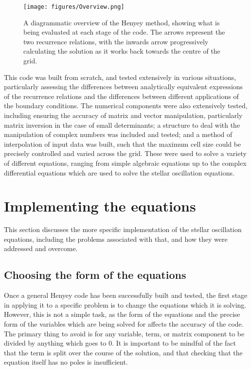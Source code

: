 \documentclass[11pt]{amsart}
\begin{document}
\begin{figure}
\begin{center}
\label{fig:overview}
\texttt{[image: figures/Overview.png]}
\caption{A diagrammatic overview of the Henyey method, showing what is being evaluated at each stage of the code.  The arrows represent the two recurrence relations, with the inwards arrow progressively calculating the solution as it works back towards the centre of the grid.}
\end{center}
\end{figure}


This code was built from scratch, and tested extensively in various situations, particularly assessing the differences between analytically equivalent expressions of the recurrence relations and the differences between different applications of the boundary conditions.  The numerical components were also extensively tested, including ensuring the accuracy of matrix and vector manipulation, particularly matrix inversion in the case of small determinants; a structure to deal with the manipulation of complex numbers was included and tested; and a method of interpolation of input data was built, such that the maximum cell size could be precisely controlled and varied across the grid.  These were used to solve a variety of different equations, ranging from simple algebraic equations up to the complex differential equations which are used to solve the stellar oscillation equations.







\section{Implementing the equations}  \label{Implement}

This section discusses the more specific implementation of the stellar oscillation equations, including the problems associated with that, and how they were addressed and overcome.

\subsection{Choosing the form of the equations}  \label{Implement:Form}

Once a general Henyey code has been successfully built and tested, the first stage in applying it to a specific problem is to change the equations which it is solving.  However, this is not a simple task, as the form of the equations and the precise form of the variables which are being solved for affects the accuracy of the code.  The primary thing to avoid is for any variable, term, or matrix component to be divided by anything which goes to $0$.  It is important to be mindful of the fact that the term is split over the course of the solution, and that checking that the equation itself has no poles is insufficient.
\end{document}
